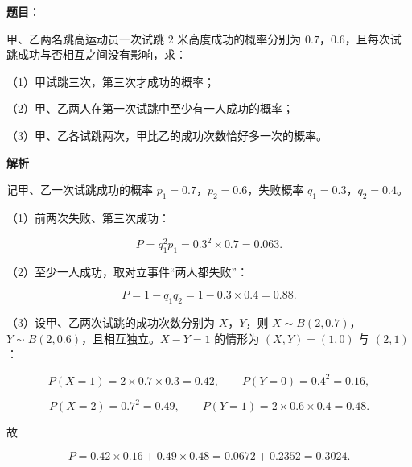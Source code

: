 \begin{answer}

\textbf{题目}：

甲、乙两名跳高运动员一次试跳 $2$ 米高度成功的概率分别为 $0.7$，$0.6$，且每次试跳成功与否相互之间没有影响，求：

（1）甲试跳三次，第三次才成功的概率；

（2）甲、乙两人在第一次试跳中至少有一人成功的概率；

（3）甲、乙各试跳两次，甲比乙的成功次数恰好多一次的概率。

\textbf{解析}

记甲、乙一次试跳成功的概率 $p_1=0.7$，$p_2=0.6$，失败概率 $q_1=0.3$，$q_2=0.4$。

（1）前两次失败、第三次成功：

\nopagebreak[4]
\[P=q_1^2p_1=0.3^2\times0.7=0.063.\]

（2）至少一人成功，取对立事件“两人都失败”：

\nopagebreak[4]
\[P=1-q_1q_2=1-0.3\times0.4=0.88.\]

（3）设甲、乙两次试跳的成功次数分别为 $X$，$Y$，则 $X\sim B(2,0.7)$，$Y\sim B(2,0.6)$，且相互独立。$X-Y=1$ 的情形为 $(X,Y)=(1,0)$ 与 $(2,1)$：

\nopagebreak[4]
\[P(X=1)=2\times0.7\times0.3=0.42,\qquad P(Y=0)=0.4^2=0.16,\]

\nopagebreak[4]
\[P(X=2)=0.7^2=0.49,\qquad P(Y=1)=2\times0.6\times0.4=0.48.\]

故

\nopagebreak[4]
\[P=0.42\times0.16+0.49\times0.48=0.0672+0.2352=0.3024.\]


\end{answer}
